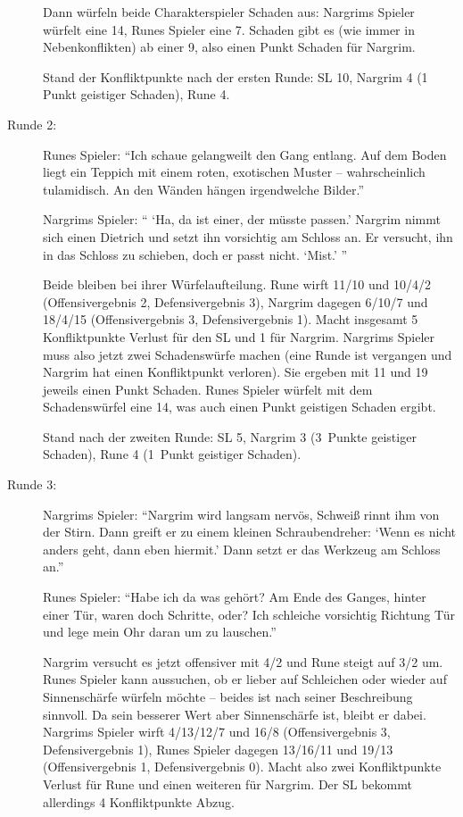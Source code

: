 \begin{beispiel}
\begin{description}
Dann würfeln beide Charakterspieler Schaden aus: Nargrims Spieler würfelt eine 14, Runes Spieler eine 7. Schaden gibt es (wie immer in Nebenkonflikten) ab einer 9, also einen Punkt Schaden für Nargrim.

Stand der Konfliktpunkte nach der ersten Runde: SL 10, Nargrim 4 (1 Punkt geistiger Schaden), Rune 4.

\item[Runde 2:] 
Runes Spieler: ``Ich schaue gelangweilt den Gang entlang. Auf dem Boden liegt ein Teppich mit einem roten, exotischen Muster -- wahrscheinlich tulamidisch. An den Wänden hängen irgendwelche Bilder.''

Nargrims Spieler: `` `Ha, da ist einer, der müsste passen.' Nargrim nimmt sich einen Dietrich und setzt ihn vorsichtig am Schloss an. Er versucht, ihn in das Schloss zu schieben, doch er passt nicht. `Mist.' ''

Beide bleiben bei ihrer Würfelaufteilung. Rune wirft 11/10 und 10/4/2 (Offensivergebnis 2, Defensivergebnis 3), Nargrim dagegen 6/10/7 und 18/4/15 (Offensivergebnis 3, Defensivergebnis 1). Macht insgesamt 5 Konfliktpunkte Verlust für den SL und 1 für Nargrim.
Nargrims Spieler muss also jetzt zwei Schadenswürfe machen (eine Runde ist vergangen und Nargrim hat einen Konfliktpunkt verloren). Sie ergeben mit 11 und 19 jeweils einen Punkt Schaden. Runes Spieler würfelt mit dem Schadenswürfel eine 14, was auch einen Punkt geistigen Schaden ergibt.

Stand nach der zweiten Runde: SL 5, Nargrim 3 (3~Punkte geistiger Schaden), Rune 4 (1~Punkt geistiger Schaden).

\item[Runde 3:]
Nargrims Spieler: ``Nargrim wird langsam nervös, Schweiß rinnt ihm von der Stirn. Dann greift er zu einem kleinen Schraubendreher: `Wenn es nicht anders geht, dann eben hiermit.' Dann setzt er das Werkzeug am Schloss an.''

Runes Spieler: ``Habe ich da was gehört? Am Ende des Ganges, hinter einer Tür, waren doch Schritte, oder? Ich schleiche vorsichtig Richtung Tür und lege mein Ohr daran um zu lauschen.''

Nargrim versucht es jetzt offensiver mit 4/2 und Rune steigt auf 3/2 um. Runes Spieler kann aussuchen, ob er lieber auf Schleichen oder wieder auf Sinnenschärfe würfeln möchte -- beides ist nach seiner Beschreibung sinnvoll. Da sein besserer Wert aber Sinnenschärfe ist, bleibt er dabei. Nargrims Spieler wirft 4/13/12/7 und 16/8 (Offensivergebnis 3, Defensivergebnis 1), Runes Spieler dagegen 13/16/11 und 19/13 (Offensivergebnis 1, Defensivergebnis 0). Macht also zwei Konfliktpunkte Verlust für Rune und einen weiteren für Nargrim. Der SL bekommt allerdings 4 Konfliktpunkte Abzug.


\end{description}
\end{beispiel}
